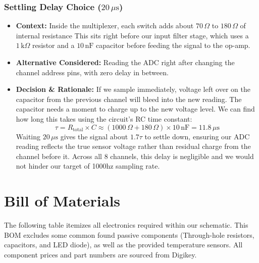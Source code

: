 \documentclass{article}
\begin{document}
\subsubsection{Settling Delay Choice ($20\,\mu\text{s}$)}
\begin{itemize}
    \item \textbf{Context:} Inside the multiplexer, each switch adds about $70\,\Omega$ to $180\,\Omega$ of internal resistance  This sits right before our input filter stage, which uses a $1\,\text{k}\Omega$ resistor and a $10\,\text{nF}$ capacitor before feeding the signal to the op-amp.
    
    \item \textbf{Alternative Considered:} Reading the ADC right after changing the channel address pins, with zero delay in between.
    
    \item \textbf{Decision \& Rationale:} If we sample immediately, voltage left over on the capacitor from the previous channel will bleed into the new reading. The capacitor needs a moment to charge up to the new voltage level. We can find how long this takes using the circuit's RC time constant:
    \begin{equation}
        \tau = R_{\text{total}} \times C \approx (1000\,\Omega + 180\,\Omega) \times 10\,\text{nF} = 11.8\,\mu\text{s}
    \end{equation}
    Waiting $20\,\mu\text{s}$ gives the signal about $1.7\tau$ to settle down, ensuring our ADC reading reflects the true sensor voltage rather than residual charge from the channel before it. Across all 8 channels, this delay is negligible and we would not hinder our target of 1000hz sampling rate. 
\end{itemize}


\section{Bill of Materials}

The following table itemizes all electronics required within our schematic. This BOM excludes some common found passive components (Through-hole resistors, capacitors, and LED diode), as well as the provided temperature sensors. All component prices and part numbers are sourced from Digikey. 
\end{document}
